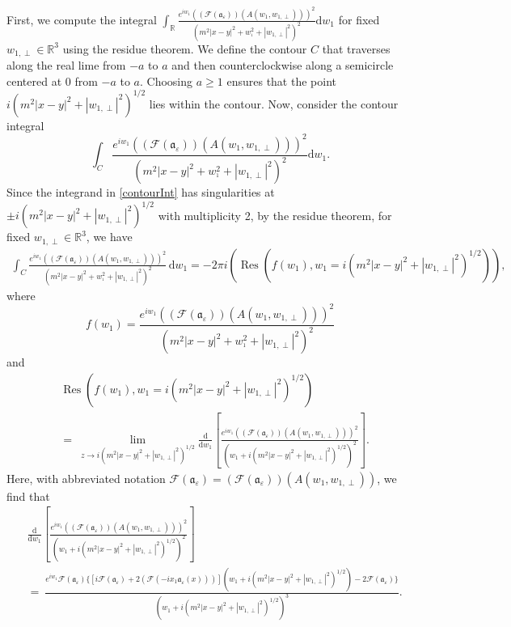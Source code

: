 \documentclass{article}
\newcommand{\mathd}{\mathrm{d}}
\newcommand{\tmop}[1]{\ensuremath{\operatorname{#1}}}
\begin{document}
First, we compute the integral $\int_{\mathbb{R}} \frac{e^{i w_1} ((\mathcal{F}
(\mathfrak{a}_{\varepsilon})) (A (w_1, w_{1, \perp})))^2}{(m^2 | x - y |^2 +
w_{^1}^2 + | w_{1, \perp} |^2)^2} \mathd w_1$ for fixed $w_{1, \perp} \in
\mathbb{R}^3$ using the residue theorem. We define the contour $C$ that traverses along the real lime from $- a$ to $a$ and then counterclockwise along a semicircle centered at 0 from $- a$ to $a$. Choosing $a \geq 1$ ensures that the point $i (m^2 | x - y |^2 + | w_{1, \perp} |^2)^{1 / 2}$ lies within the contour. Now, consider the contour integral
%
\begin{equation}
  \int_C \frac{e^{i w_1} ((\mathcal{F} (\mathfrak{a}_{\varepsilon})) (A (w_1,
  w_{1, \perp})))^2}{(m^2 | x - y |^2 + w_{^1}^2 + | w_{1, \perp} |^2)^2}
  \mathd w_1 . \label{contourInt}
\end{equation}
%
Since the integrand in \eqref{contourInt} has singularities at $\pm i (m^2 |
x - y |^2 + | w_{1, \perp} |^2)^{1 / 2}$ with multiplicity 2, by the residue theorem, for fixed $w_{1, \perp} \in \mathbb{R}^3$, we have
\begin{align}
  \int_C \frac{e^{i w_1} ((\mathcal{F} (\mathfrak{a}_{\varepsilon})) (A (w_1,
  w_{1, \perp})))^2}{(m^2 | x - y |^2 + w_{^1}^2 + | w_{1, \perp} |^2)^2}
  \, \mathd w_1  = - 2 \pi i (\tmop{Res} (f (w_1), w_1 = i (m^2 | x - y |^2 + |
  w_{1, \perp} |^2)^{1 / 2})), \label{R1}
\end{align}
where 
%
$$ f (w_1) = \frac{e^{i w_1} ((\mathcal{F} (\mathfrak{a}_{\varepsilon}))
(A (w_1, w_{1, \perp})))^2}{(m^2 | x - y |^2 + w_{^1}^2 + | w_{1, \perp}
|^2)^2}$$ 
and
%
\begin{align}
    & \tmop{Res} (f (w_1), w_1 = i (m^2 | x - y |^2 + | w_{1, \perp} |^2)^{1
    / 2}) \nonumber \\
    & = ~ \lim_{z \rightarrow i (m^2 | x - y |^2 + | w_{1, \perp} |^2)^{1 / 2}}
    \frac{\mathd}{\mathd w_1} \left[ \frac{e^{i w_1} ((\mathcal{F}
    (\mathfrak{a}_{\varepsilon})) (A (w_1, w_{1, \perp})))^2}{(w_1 + i (m^2 |
    x - y |^2 + | w_{1, \perp} |^2)^{1 / 2})^2} \right].
  \label{eqn-residue}
\end{align}
%
Here, with abbreviated notation
$\mathcal{F} (\mathfrak{a}_{\varepsilon}) = (\mathcal{F}
(\mathfrak{a}_{\varepsilon})) (A (w_1, w_{1, \perp}))$, we find that
%
\begin{align}
    & \frac{\mathd}{\mathd w_1} \left[ \frac{e^{i w_1} ((\mathcal{F}
     (\mathfrak{a}_{\varepsilon})) (A (w_1, w_{1, \perp})))^2}{(w_1 + i (m^2 |
     x - y |^2 + | w_{1, \perp} |^2)^{1 / 2})^2} \right]\\
     & = ~ \frac{e^{i w_1} \mathcal{F} (\mathfrak{a}_{\varepsilon}) \{
     [i\mathcal{F} (\mathfrak{a}_{\varepsilon}) + 2 (\mathcal{F} (- i x_1
     \mathfrak{a}_{\varepsilon} (x)))] (w_1 + i (m^2 | x - y |^2 + | w_{1,
     \perp} |^2)^{1 / 2}) - 2\mathcal{F} (\mathfrak{a}_{\varepsilon}) \}}{(w_1
     + i (m^2 | x - y |^2 + | w_{1, \perp} |^2)^{1 / 2})^3}   . 
\end{align}
\end{document}
